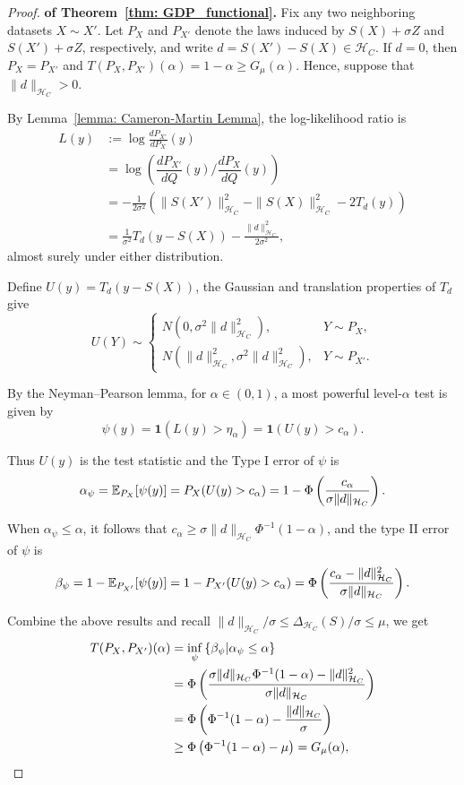 \begin{proof}\textbf{of Theorem~\ref{thm: GDP_functional}.}
Fix any two neighboring datasets $X\sim X'$. Let $P_X$ and $P_{X'}$ denote the laws induced by $S(X)+\sigma Z$ and $S(X')+\sigma Z$, respectively, and write $d=S(X')-S(X)\in\mathcal H_C$. If $d=0$, then $P_X=P_{X'}$ and $T(P_X,P_{X'})(\alpha)=1-\alpha\ge G_\mu(\alpha)$. Hence, suppose that $\|d\|_{\mathcal H_C}>0$.

By Lemma~\ref{lemma: Cameron-Martin Lemma}, the log-likelihood ratio is
\begin{align*}
L(y)
&:=\log\frac{dP_{X'}}{dP_X}(y)\\
&=\log \left(\dfrac{d P_{X'}}{dQ}(y) / \dfrac{d P_X}{dQ}(y)\right)\\
&=
-\frac{1}{2\sigma^2}
\left(
\|S(X')\|_{\mathcal H_C}^2
-\|S(X)\|_{\mathcal H_C}^2
-2T_d(y)
\right)\\
&=
\frac{1}{\sigma^2}T_d(y-S(X))
-\frac{\|d\|_{\mathcal H_C}^2}{2\sigma^2},
\end{align*}
almost surely under either distribution.

Define $U(y)=T_d(y-S(X))$, the Gaussian and translation properties of $T_d$ give
\[
U(Y)\sim
\begin{cases}
N(0,\sigma^2\|d\|_{\mathcal H_C}^2),
& Y\sim P_X,\\[2pt]
N(\|d\|_{\mathcal H_C}^2,
  \sigma^2\|d\|_{\mathcal H_C}^2),
& Y\sim P_{X'}.
\end{cases}
\]

By the Neyman--Pearson lemma, for $\alpha\in(0,1)$, a most powerful level-$\alpha$ test is given by
\[
\psi(y) = \mathbf{1}(L(y)>\eta_\alpha)
=\mathbf{1}(U(y)>c_{\alpha}).
\]

Thus $U(y)$ is the test statistic and the Type I error of $\psi$ is
\begin{align*}
    \alpha_\psi=\mathbb{E}_{P_X}[\psi(y)]
    =P_X(U(y)>c_\alpha)
    =1-\Phi\Bra{\dfrac{c_\alpha}{\sigma\|d\|_{\mathcal{H}_C}}}.
\end{align*}

When $\alpha_\psi\leq \alpha$, it follows that $c_\alpha\geq \sigma\|d\|_{\mathcal H_C}\Phi^{-1}(1-\alpha)$, and the type II error of $\psi$ is
\begin{align*}
    \beta_\psi
    =1-\mathbb{E}_{P_{X'}}[\psi(y)]
    =1-P_{X'}(U(y)>c_\alpha)
    =\Phi\Bra{\dfrac{c_\alpha-\|d\|_{\mathcal{H}_C}^2}{\sigma\|d\|_{\mathcal{H}_C}}}.
\end{align*}

Combine the above results and recall $\|d\|_{\mathcal H_C}/\sigma \le \Delta_{\mathcal H_C}(S)/\sigma\le \mu$, we get
\begin{align*}
T(P_X,P_{X'})(\alpha)
&=\inf_{\psi}\Set{\beta_\psi|\alpha_\psi\le\alpha}\\
&=
\Phi\left(
\frac{\sigma\|d\|_{\mathcal H_C}\Phi^{-1}(1-\alpha)-\|d\|_{\mathcal H_C}^2}
     {\sigma\|d\|_{\mathcal H_C}}
\right)\\
&=
\Phi\left(
\Phi^{-1}(1-\alpha)
-\frac{\|d\|_{\mathcal H_C}}{\sigma}
\right)\\
&\ge
\Phi\left(\Phi^{-1}(1-\alpha)-\mu\right)
=
G_\mu(\alpha),
\end{align*}


\end{proof}
